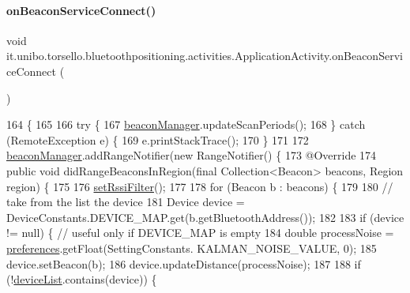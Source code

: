 \paragraph{\texorpdfstring{on\+Beacon\+Service\+Connect()}{onBeaconServiceConnect()}}
{\footnotesize\ttfamily void it.\+unibo.\+torsello.\+bluetoothpositioning.\+activities.\+Application\+Activity.\+on\+Beacon\+Service\+Connect (\begin{DoxyParamCaption}{ }\end{DoxyParamCaption})}


\begin{DoxyCode}
164                                          \{
165 
166         \textcolor{keywordflow}{try} \{
167             \hyperlink{classit_1_1unibo_1_1torsello_1_1bluetoothpositioning_1_1activities_1_1ApplicationActivity_a973c37226a3dbba6016966c3555aff65_a973c37226a3dbba6016966c3555aff65}{beaconManager}.updateScanPeriods();
168         \} \textcolor{keywordflow}{catch} (RemoteException e) \{
169             e.printStackTrace();
170         \}
171 
172         \hyperlink{classit_1_1unibo_1_1torsello_1_1bluetoothpositioning_1_1activities_1_1ApplicationActivity_a973c37226a3dbba6016966c3555aff65_a973c37226a3dbba6016966c3555aff65}{beaconManager}.addRangeNotifier(\textcolor{keyword}{new} RangeNotifier() \{
173             @Override
174             \textcolor{keyword}{public} \textcolor{keywordtype}{void} didRangeBeaconsInRegion(\textcolor{keyword}{final} Collection<Beacon> beacons, Region region) \{
175 
176                 \hyperlink{classit_1_1unibo_1_1torsello_1_1bluetoothpositioning_1_1activities_1_1ApplicationActivity_a8b2514096adfe574c15cc5317a45cd58_a8b2514096adfe574c15cc5317a45cd58}{setRssiFilter}();
177 
178                 \textcolor{keywordflow}{for} (Beacon b : beacons) \{
179 
180                     \textcolor{comment}{// take from the list the device}
181                     Device device = DeviceConstants.DEVICE\_MAP.get(b.getBluetoothAddress());
182 
183                     \textcolor{keywordflow}{if} (device != null) \{ \textcolor{comment}{// useful only if DEVICE\_MAP is empty}
184                         \textcolor{keywordtype}{double} processNoise = \hyperlink{classit_1_1unibo_1_1torsello_1_1bluetoothpositioning_1_1activities_1_1ApplicationActivity_a3ee672ef79c268d0618ff3276c2e85f0_a3ee672ef79c268d0618ff3276c2e85f0}{preferences}.getFloat(SettingConstants.
      KALMAN\_NOISE\_VALUE, 0);
185                         device.setBeacon(b);
186                         device.updateDistance(processNoise);
187 
188                         \textcolor{keywordflow}{if} (!\hyperlink{classit_1_1unibo_1_1torsello_1_1bluetoothpositioning_1_1activities_1_1ApplicationActivity_ad146f35cfee210f7191442658a235a2f_ad146f35cfee210f7191442658a235a2f}{deviceList}.contains(device)) \{

\end{DoxyCode}

